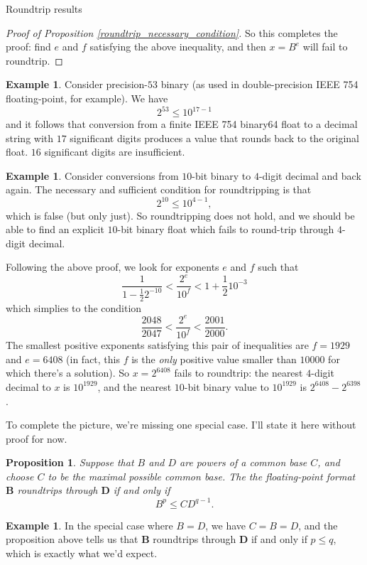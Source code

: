 \documentclass{article}
\theoremstyle{plain}
\newtheorem{proposition}[lemma]{Proposition}
\theoremstyle{definition}
\newtheorem{example}[lemma]{Example}
\begin{document}
\begin{section}{Roundtrip results}
\begin{proof}[Proof of Proposition \ref{roundtrip_necessary_condition}]
  So this completes the proof: find $e$ and $f$ satisfying the above
  inequality, and then $x = B^e$ will fail to roundtrip.
\end{proof}

\begin{example}
  Consider precision-$53$ binary (as used in double-precision IEEE 754
  floating-point, for example). We have
  $$2^{53} \le 10^{17 - 1}$$ and it follows that conversion from a finite IEEE
  754 binary64 float to a decimal string with $17$ significant digits produces
  a value that rounds back to the original float. $16$ significant digits are
  insufficient.
\end{example}

\begin{example}
  Consider conversions from $10$-bit binary to $4$-digit decimal and back
  again.  The necessary and sufficient condition for roundtripping is that
  $$2^{10} \le 10^{4-1},$$ which is false (but only just). So roundtripping
  does not hold, and we should be able to find an explicit $10$-bit binary
  float which fails to round-trip through $4$-digit decimal.

  Following the above proof, we look for exponents $e$ and $f$ such that
  $$\frac{1}{1 - \frac12 2^{-10}} < \frac{2^e}{10^f} < 1 + \frac12 10^{-3}$$
  which simplies to the condition
  $$\frac{2048}{2047} < \frac{2^e}{10^f} < \frac{2001}{2000}.$$ The smallest
  positive exponents satisfying this pair of inequalities are $f=1929$ and
  $e=6408$ (in fact, this $f$ is the \emph{only} positive value smaller than
  $10000$ for which there's a solution). So $x = 2^{6408}$ fails to roundtrip:
  the nearest $4$-digit decimal to $x$ is $10^{1929}$, and the nearest $10$-bit
  binary value to $10^{1929}$ is $2^{6408} - 2^{6398}$.
\end{example}

To complete the picture, we're missing one special case. I'll state it here
without proof for now.

\begin{proposition}
  Suppose that $B$ and $D$ are powers of a common base $C$, and choose $C$ to
  be the maximal possible common base. The the floating-point format $\mathbf
  B$ roundtrips through $\mathbf D$ if and only if
  $$B^p \le C D^{q-1}.$$
\end{proposition}

\begin{example}
  In the special case where $B=D$, we have $C = B = D$, and the proposition
  above tells us that $\mathbf B$ roundtrips through $\mathbf D$ if and only if
  $p\le q$, which is exactly what we'd expect.
\end{example}

\end{section}
\end{document}
